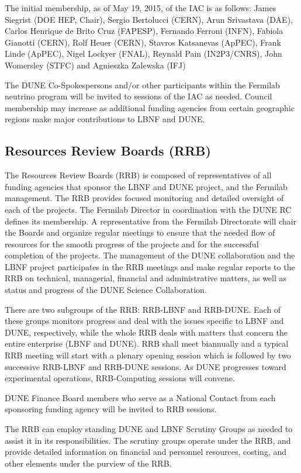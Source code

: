 The initial membership, as of May 19, 2015, of the IAC is as follows:
James Siegrist (DOE HEP, Chair),
Sergio Bertolucci (CERN),
Arun Srivastava (DAE),
Carlos Henrique de Brito Cruz (FAPESP),
Fernando Ferroni (INFN),
Fabiola Gianotti (CERN),
Rolf Heuer (CERN),
Stavros Katsanevas (ApPEC),
Frank Linde (ApPEC),
Nigel Lockyer (FNAL),
Reynald Pain (IN2P3/CNRS),
John Womersley (STFC) and
Agnieszka Zalewska (IFJ)

The DUNE Co-Spokespersons and/or other participants within
the Fermilab neutrino program will be invited to sessions of the IAC as
needed. Council membership may increase as additional funding agencies
from certain geographic regions make major contributions to LBNF and DUNE.

\subsection{Resources Review Boards (RRB)}

The Resources Review Boards (RRB) is composed of representatives of all
funding agencies that sponsor the LBNF and DUNE project, and the Fermilab
management. The RRB provides focused monitoring and detailed oversight
of each of the projects. The Fermilab Director in coordination
with the DUNE RC defines its membership. A representative from the
Fermilab Directorate will chair the Boards and
organize regular meetings to ensure that the needed flow of resources
for the smooth progress of the projects and for the successful completion
of the projects. The management of the
DUNE collaboration and the LBNF project participates in the RRB meetings
and make regular reports to the RRB on technical, managerial,
financial and administrative matters, as well as status and
progress of the DUNE Science Collaboration.

There are two subgroups of the RRB: RRB-LBNF and RRB-DUNE. Each of
these groups monitors progress and deal with the issues specific to
LBNF and DUNE, respectively, while the whole RRB deals with matters
that concern the entire enterprise (LBNF and DUNE). RRB shall meet
biannually and a typical RRB meeting will start with a plenary
opening session which is followed by two
successive RRB-LBNF and RRB-DUNE sessions. As DUNE progresses toward
experimental operations, RRB-Computing sessions will convene.

DUNE Finance Board members who serve as a National Contact from each
sponsoring funding agency will be invited to RRB sessions.

The RRB can employ standing DUNE and LBNF Scrutiny Groups as needed
to assist it in its responsibilities. The scrutiny groups operate
under the RRB, and provide detailed information on financial and
personnel resources, costing, and other elements under the purview of the RRB.

